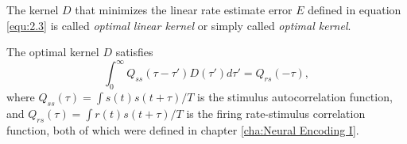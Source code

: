 \begin{defn}
  \label{def:optimalKernel}
  The kernel $D$ that minimizes the linear rate estimate error $E$ defined in equation \ref{equ:2.3} is called \emph{optimal linear kernel} or simply called \emph{optimal kernel}.
\end{defn}

\begin{prop}
  \label{prop:OptimalLinearKernel}
  The optimal kernel $D$ satisfies
  \begin{equation}
    \label{equ:2.4}
    \int_0^{\infty}Q_{ss}(\tau-\tau')D(\tau')d\tau' = Q_{rs}(-\tau),
  \end{equation}
  where $Q_{ss}(\tau) = \int s(t)s(t+\tau)/T$ is the stimulus autocorrelation function, and $Q_{rs}(\tau) = \int r(t)s(t+\tau)/T$ is the firing rate-stimulus correlation function, both of which were defined in chapter \ref{cha:Neural Encoding I}.
\end{prop}

